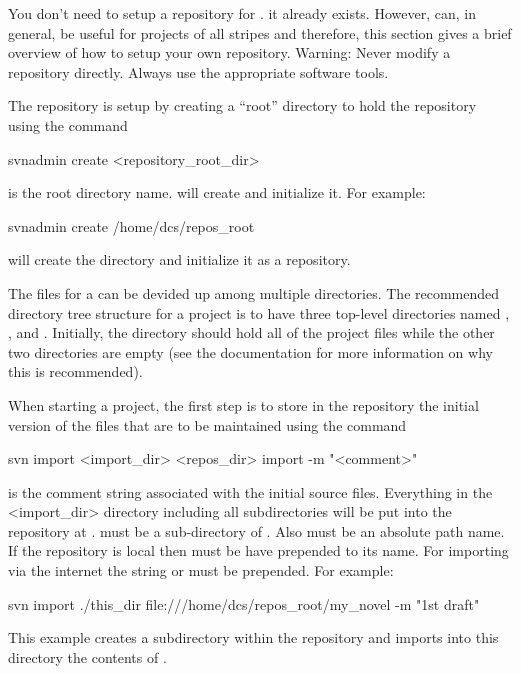 You don't need to setup a \svn repository for \bmad. it already
exists. However, \svn can, in general, be useful for projects of all
stripes and therefore, this section gives a brief overview of how to
setup your own \svn repository. Warning: Never modify a repository
directly. Always use the appropriate software tools.

The \svn repository is setup by creating a ``root'' directory
to hold the repository using the command
\begin{example}
  svnadmin create <repository_root_dir> 
\end{example}
 is the root directory name. \svn will create
 and initialize it. For example:
\begin{example}
  svnadmin create /home/dcs/repos_root
\end{example}
will create the  directory and initialize it as a \svn repository.

The files for a  can be devided up among multiple directories. 
The recommended directory tree structure for a project is to have three 
top-level directories named , , and . 
Initially, the  directory should hold all of the project files
while the other two directories are empty (see the \svn documentation for
more information on why this is recommended).

When starting a project, the first step is to store in the repository
the initial version of the 
files that are to be maintained using the command
\begin{example}
  svn import <import_dir> <repos_dir> import -m "<comment>" 
\end{example}
 is the comment string associated with the initial source
files. Everything in the <import_dir> directory including all
subdirectories will be put into the \svn repository at
.  must be a
sub-directory of . Also
 must be an absolute path name. If the \svn
repository is local then  must be have
 prepended to its name. For importing via the internet the
string  or  must be prepended. For example:
\begin{example}
  svn import ./this_dir file:///home/dcs/repos_root/my_novel -m "1st draft"
\end{example}
This example creates a subdirectory  within
the repository and imports into this directory the contents of .

